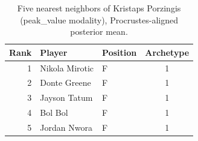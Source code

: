 \begin{table}[htbp]
  \centering\small
  \begin{tabular}{rllc}
    \toprule
    Rank & Player & Position & Archetype \\
    \midrule
    1 & Nikola Mirotic & F & 1 \\
    2 & Donte Greene & F & 1 \\
    3 & Jayson Tatum & F & 1 \\
    4 & Bol Bol & F & 1 \\
    5 & Jordan Nwora & F & 1 \\
    \bottomrule
  \end{tabular}
  \caption{Five nearest neighbors of Kristaps Porzingis (peak_value modality), Procrustes-aligned posterior mean.}
  \label{tab:Kristaps_Porzingis_neighbors_peak_value}
\end{table}


